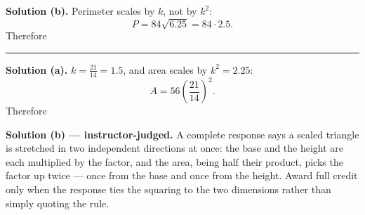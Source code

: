 \documentclass[12pt]{article}
\begin{document}
\noindent\textbf{Solution (b).} Perimeter scales by $k$, not by $k^2$:
\[ P = 84 \sqrt{6.25} = 84 \cdot 2.5 . \]
Therefore 

\vspace{0.15cm}\noindent\rule{\linewidth}{0.2pt}


\noindent\textbf{Solution (a).} $k = \frac{21}{14} = 1.5$, and area scales by
$k^2 = 2.25$:
\[ A = 56 \left( \frac{21}{14} \right)^2 . \]
Therefore 

\noindent\textbf{Solution (b) --- instructor-judged.} A complete response says a
scaled triangle is stretched in two independent directions at once: the base and
the height are each multiplied by the factor, and the area, being half their
product, picks the factor up twice --- once from the base and once from the
height. Award full credit only when the response ties the squaring to the two
dimensions rather than simply quoting the rule.
\end{document}
